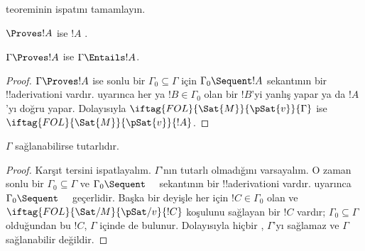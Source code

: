 \begin{prob}
 teoreminin ispatını tamamlayın.
\end{prob}
\tagendprob

\begin{cor}
$\Proves !A$ ise $!A$ .
\end{cor}

\begin{cor}
$\Gamma\Proves !A$ ise $\Gamma\Entails !A$.
\end{cor}

\begin{proof}
$\Gamma\Proves !A$ ise sonlu bir $\Gamma_0\subseteq\Gamma$ için
$\Gamma_0\Sequent !A$ sekantının bir !!a{derivation}{}i vardır.
 uyarınca her
 ya
  $!B\in\Gamma_0$ olan bir $!B$'yi yanlış yapar ya da $!A$'yı doğru yapar.
Dolayısıyla $\iftag{FOL}{\Sat{M}}{\pSat{v}}{\Gamma}$ ise
$\iftag{FOL}{\Sat{M}}{\pSat{v}}{!A}$.
\end{proof}

\begin{cor}
$\Gamma$ sağlanabilirse tutarlıdır.
\end{cor}

\begin{proof}
Karşıt tersini ispatlayalım. $\Gamma$'nın tutarlı olmadığını varsayalım. O
zaman sonlu bir $\Gamma_0\subseteq\Gamma$ ve $\Gamma_0\Sequent\quad$
sekantının bir !!a{derivation}{}i vardır. 
uyarınca $\Gamma_0\Sequent\quad$ geçerlidir. Başka bir deyişle her
 için
  $!C\in\Gamma_0$ olan ve $\iftag{FOL}{\Sat/{M}}{\pSat/{v}}{!C}$ koşulunu
  sağlayan bir $!C$
vardır; $\Gamma_0\subseteq\Gamma$ olduğundan bu $!C$, $\Gamma$ içinde de
bulunur. Dolayısıyla hiçbir ,
$\Gamma$'yı sağlamaz ve $\Gamma$ sağlanabilir değildir.
\end{proof}

